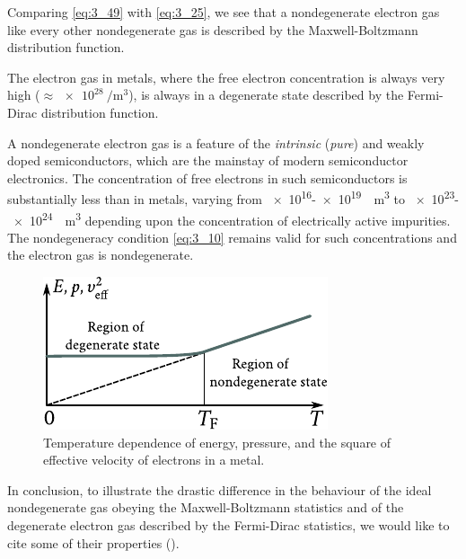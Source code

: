 \noindent
Comparing \eqref{eq:3_49} with \eqref{eq:3_25}, we see that a nondegenerate electron gas like every other nondegenerate gas is described by the Maxwell-Boltzmann distribution function.

The electron gas in metals, where the free electron concentration is always very high ($\approx\SI{e28}{\per\metre\cubed}$), is always in a degenerate state described by the Fermi-Dirac distribution function.

A nondegenerate electron gas is a feature of the \textit{intrinsic} (\textit{pure}) and weakly doped semiconductors, which are the mainstay of modern semiconductor electronics. The concentration of free electrons in such semiconductors is substantially less than in metals, varying from
\num{e16}-\num{e19}~\si{\per\metre\cubed} to \num{e23}-\num{e24}~\si{\per\metre\cubed} depending upon the concentration of electrically active impurities. The nondegeneracy condition \eqref{eq:3_10} remains valid for such concentrations and the electron gas is nondegenerate.

\begin{figure}[t]
	\begin{center}
		\includegraphics[scale=1]{figures/ch_03/fig_3_7.pdf}
		\caption[]{Temperature dependence of energy, pressure, and the square of effective velocity of electrons in a metal.}
		\label{fig:3_7}
	\end{center}
	\vspace{-0.7cm}
\end{figure}

In conclusion, to illustrate the drastic difference in the behaviour of the ideal nondegenerate gas obeying the Maxwell-Boltzmann statistics and of the degenerate electron gas described by the Fermi-Dirac statistics, we would like to cite some of their properties ().

